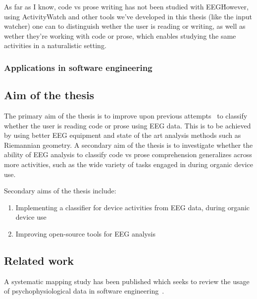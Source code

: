         As far as I know, code vs prose writing has not been studied with EEG\. However, using ActivityWatch and other tools we've developed in this thesis (like the input watcher) one can to distinguish wether the user is reading or writing, as well as wether they're working with code or prose, which enables studying the same activities in a naturalistic setting.

    \subsubsection{Applications in software engineering}




\subsection{Aim of the thesis}

    The primary aim of the thesis is to improve upon previous attempts~\cite{fucci_replication_2019} to classify whether the user is reading code or prose using EEG data. This is to be achieved by using better EEG equipment and state of the art analysis methods such as Riemannian geometry. A secondary aim of the thesis is to investigate whether the ability of EEG analysis to classify code vs prose comprehension generalizes across more activities, such as the wide variety of tasks engaged in during organic device use.

    Secondary aims of the thesis include:

    \begin{enumerate}
        \item Implementing a classifier for device activities from EEG data, during organic device use
        \item Improving open-source tools for EEG analysis
    \end{enumerate}


\subsection{Related work}

    A systematic mapping study has been published which seeks to review the usage of psychophysiological data in software engineering~\cite{vieira_usage_2021}.

